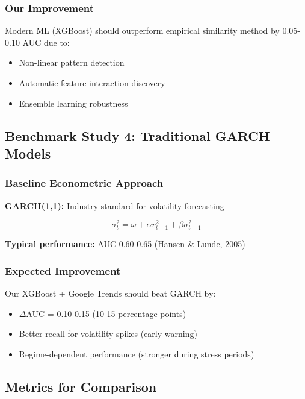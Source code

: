 \documentclass[12pt,a4paper]{article}
\begin{document}
\subsubsection{Our Improvement}

Modern ML (XGBoost) should outperform empirical similarity method by 0.05-0.10 AUC due to:
\begin{itemize}
    \item Non-linear pattern detection
    \item Automatic feature interaction discovery
    \item Ensemble learning robustness
\end{itemize}

\subsection{Benchmark Study 4: Traditional GARCH Models}

\subsubsection{Baseline Econometric Approach}

\textbf{GARCH(1,1):} Industry standard for volatility forecasting

\begin{equation}
\sigma_t^2 = \omega + \alpha r_{t-1}^2 + \beta \sigma_{t-1}^2
\end{equation}

\textbf{Typical performance:} AUC 0.60-0.65 (Hansen \& Lunde, 2005)

\subsubsection{Expected Improvement}

Our XGBoost + Google Trends should beat GARCH by:
\begin{itemize}
    \item $\Delta$AUC = 0.10-0.15 (10-15 percentage points)
    \item Better recall for volatility spikes (early warning)
    \item Regime-dependent performance (stronger during stress periods)
\end{itemize}

\subsection{Metrics for Comparison}
\end{document}

